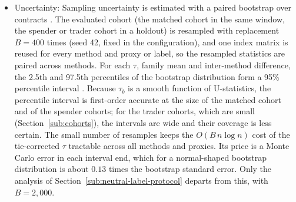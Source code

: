 \begin{itemize}
\item Uncertainty: Sampling uncertainty is estimated with a paired bootstrap over contracts \parencite{efron1979bootstrap}. The evaluated cohort (the matched cohort in the same window, the spender or trader cohort in a holdout) is resampled with replacement $B=400$ times (seed 42, fixed in the configuration), and one index matrix is reused for every method and proxy or label, so the resampled statistics are paired across methods. For each $\tau$, family mean and inter-method difference, the 2.5th and 97.5th percentiles of the bootstrap distribution form a 95\% percentile interval \parencite{diciccio1996bootstrap}. Because $\tau_b$ is a smooth function of U-statistics, the percentile interval is first-order accurate at the size of the matched cohort and of the spender cohorts; for the trader cohorts, which are small (Section~\ref{sub:cohorts}), the intervals are wide and their coverage is less certain. The small number of resamples keeps the $O(B\,n\log n)$ cost of the tie-corrected $\tau$ tractable across all methods and proxies. Its price is a Monte Carlo error in each interval end, which for a normal-shaped bootstrap distribution is about $0.13$ times the bootstrap standard error. Only the analysis of Section~\ref{sub:neutral-label-protocol} departs from this, with $B=2{,}000$.


\end{itemize}

